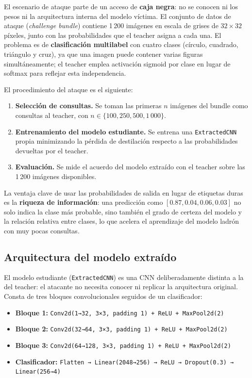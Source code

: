 \documentclass[11pt,a4paper]{article}
\begin{document}
El escenario de ataque parte de un acceso de \textbf{caja negra}: no se conocen ni los pesos ni la arquitectura interna del modelo víctima. El conjunto de datos de ataque (\textit{challenge bundle}) contiene 1\,200 imágenes en escala de grises de $32\times32$ píxeles, junto con las probabilidades que el teacher asigna a cada una. El problema es de \textbf{clasificación multilabel} con cuatro clases (círculo, cuadrado, triángulo y cruz), ya que una imagen puede contener varias figuras simultáneamente; el teacher emplea activación sigmoid por clase en lugar de softmax para reflejar esta independencia.

El procedimiento del ataque es el siguiente:

\begin{enumerate}
  \item \textbf{Selección de consultas.} Se toman las primeras $n$ imágenes del bundle como consultas al teacher, con $n \in \{100, 250, 500, 1\,000\}$.
  \item \textbf{Entrenamiento del modelo estudiante.} Se entrena una \texttt{ExtractedCNN} propia minimizando la pérdida de destilación respecto a las probabilidades devueltas por el teacher.
  \item \textbf{Evaluación.} Se mide el acuerdo del modelo extraído con el teacher sobre las 1\,200 imágenes disponibles.
\end{enumerate}

La ventaja clave de usar las probabilidades de salida en lugar de etiquetas duras es la \textbf{riqueza de información}: una predicción como $[0.87, 0.04, 0.06, 0.03]$ no solo indica la clase más probable, sino también el grado de certeza del modelo y la relación relativa entre clases, lo que acelera el aprendizaje del modelo ladrón con muy pocas consultas.

\subsection{Arquitectura del modelo extraído}

El modelo estudiante (\texttt{ExtractedCNN}) es una CNN deliberadamente distinta a la del teacher: el atacante no necesita conocer ni replicar la arquitectura original. Consta de tres bloques convolucionales seguidos de un clasificador:

\begin{itemize}
  \item \textbf{Bloque 1:} \texttt{Conv2d(1→32, 3×3, padding 1) + ReLU + MaxPool2d(2)}
  \item \textbf{Bloque 2:} \texttt{Conv2d(32→64, 3×3, padding 1) + ReLU + MaxPool2d(2)}
  \item \textbf{Bloque 3:} \texttt{Conv2d(64→128, 3×3, padding 1) + ReLU + MaxPool2d(2)}
  \item \textbf{Clasificador:} \texttt{Flatten → Linear(2048→256) → ReLU → Dropout(0.3) → Linear(256→4)}
\end{itemize}
\end{document}
